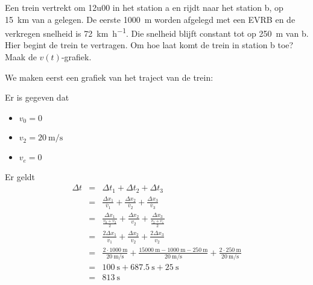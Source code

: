 \documentclass{ximera}
\begin{document}
\begin{exercise}
        Een trein vertrekt om 12u00 in het station a en rijdt naar het station b, op \SI{15}{\kilo\meter} van a gelegen. 
        De eerste \SI{1000}{\meter} worden afgelegd met een EVRB en de verkregen snelheid is \SI{72}{\kilo\meter\per\hour}. 
        Die snelheid blijft constant tot op \SI{250}{\meter} van b. Hier begint de trein te vertragen. Om hoe laat komt de trein in station b toe? Maak de $v(t)$-grafiek.

        \begin{oplossing}
        We maken eerst een grafiek van het traject van de trein: 
        \begin{image}
            
        \end{image}
        Er is gegeven dat 
        \begin{itemize}
            \item \(v_0 = 0\)
            \item \(v_2 = \SI{20}{\meter\per\second}\)
            \item \(v_e = 0\)
        \end{itemize}

        Er geldt
        \renewcommand{\arraystretch}{2.5}
        \[
        \begin{array}{rcl}
        \Delta t &=& \Delta t_1 + \Delta t_2 + \Delta t_3 \\
        &=& \frac{\Delta x_1}{\overline{v}_1} + \frac{\Delta x_2}{\overline{v}_2} + \frac{\Delta x_3}{\overline{v}_3}\\
        &=& \frac{\Delta x_1}{\frac{v_0 + v_2}{2}} + \frac{\Delta x_2}{v_2} + \frac{\Delta x_3}{\frac{v_2 + v_e}{2}}\\
        &=& \frac{2\Delta x_1}{\overline{v}_1} + \frac{\Delta x_2}{v_2} + \frac{2\Delta x_3}{v_2}\\
        &=& \frac{2 \cdot \SI{1000}{\meter}}{\SI{20}{\meter\per\second}} + \frac{\SI{15000}{\meter} - \SI{1000}{\meter} - \SI{250}{\meter}}{\SI{20}{\meter\per\second}} + \frac{2\cdot \SI{250}{\meter}}{\SI{20}{\meter\per\second}}\\
        &=& \SI{100}{\second} + \SI{687.5}{\second} + \SI{25}{\second}\\ 
        &=& \SI{813}{\second}
        \end{array} 
        \]
        \renewcommand{\arraystretch}{1}



\end{oplossing}
\end{exercise}
\end{document}
